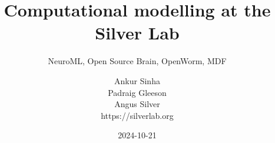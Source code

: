 \renewcommand{\figurename}{}


\renewcommand{\footnoterule}{}
\renewcommand*{\bibfont}{\tiny}

\title{Computational modelling at the Silver Lab}
\subtitle{NeuroML, Open Source Brain, OpenWorm, MDF}
\author[Ankur Sinha]{Ankur Sinha\\Padraig Gleeson\\Angus Silver\\https://silverlab.org}
\date{2024-10-21}




\begin{frame}
  \titlepage{}
\end{frame}

